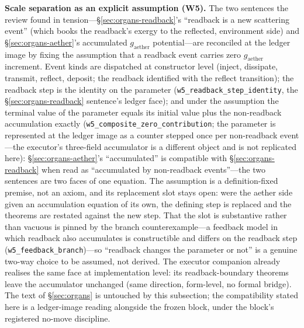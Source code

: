 \documentclass[11pt,a4paper]{article}
\newcommand{\gaether}{g_{\mathrm{aether}}}
\newcommand{\thm}[1]{\nolinkurl{#1}}
\begin{document}
\textbf{Scale separation as an explicit assumption (W5).} The two sentences the review found in tension---\S\ref{sec:organs-readback}'s ``readback is a new scattering event'' (which books the readback's exergy to the reflected, environment side) and \S\ref{sec:organs-aether}'s accumulated $\gaether$ potential---are reconciled at the ledger image by fixing the assumption that a readback event carries zero $\gaether$ increment. Event kinds are dispatched at constructor level (inject, dissipate, transmit, reflect, deposit; the readback identified with the reflect transition); the readback step is the identity on the parameter (\thm{w5_readback_step_identity}, the \S\ref{sec:organs-readback} sentence's ledger face); and under the assumption the terminal value of the parameter equals its initial value plus the non-readback accumulation exactly (\thm{w5_composite_zero_contribution}; the parameter is represented at the ledger image as a counter stepped once per non-readback event---the executor's three-field accumulator is a different object and is not replicated here): \S\ref{sec:organs-aether}'s ``accumulated'' is compatible with \S\ref{sec:organs-readback} when read as ``accumulated by non-readback events''---the two sentences are two faces of one equation. The assumption is a definition-fixed premise, not an axiom, and its replacement slot stays open: were the aether side given an accumulation equation of its own, the defining step is replaced and the theorems are restated against the new step. That the slot is substantive rather than vacuous is pinned by the branch counterexample---a feedback model in which readback also accumulates is constructible and differs on the readback step (\thm{w5_feedback_branch})---so ``readback changes the parameter or not'' is a genuine two-way choice to be assumed, not derived. The executor companion already realises the same face at implementation level: its readback-boundary theorems leave the accumulator unchanged (same direction, form-level, no formal bridge). The text of \S\ref{sec:organs} is untouched by this subsection; the compatibility stated here is a ledger-image reading alongside the frozen block, under the block's registered no-move discipline.
\end{document}
